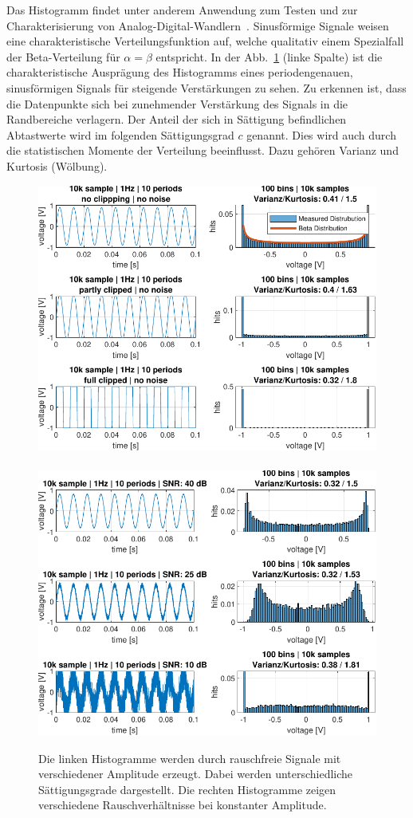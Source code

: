 Das Histogramm findet unter anderem Anwendung zum Testen und zur Charakterisierung von Analog-Digital-Wandlern~\cite{Gamad-2009}. Sinusförmige Sig\-nale weisen eine charakteristische Verteilungsfunktion auf, welche qualitativ einem Spezialfall der Beta-Verteilung für $\alpha = \beta$ entspricht. In der Abb.~\ref{fig:Histogramm-Gain} (linke Spalte) ist die charakteristische Ausprägung des Histogramms eines periodengenauen, sinusförmigen Signals für steigende Verstärkungen zu sehen. Zu erkennen ist, dass die Datenpunkte sich bei zunehmender Verstärkung des Signals in die Randbereiche verlagern. Der Anteil der sich in Sättigung befindlichen Abtastwerte wird im folgenden Sättigungsgrad $c$ genannt. Dies wird auch durch die statistischen Momente der Verteilung beeinflusst. Dazu gehören Varianz und Kurtosis (Wölbung).
\begin{figure}[h!] 
	\hspace*{-2mm}
	\centering 
	\includegraphics[width=1.05\columnwidth]{../img/beta-distribution.pdf}~~~~~
	\includegraphics[width=1.05\columnwidth]{../img/noise-histogramm.pdf}
	\caption{Die linken Histogramme werden durch rauschfreie Signale mit verschiedener Amplitude erzeugt. Dabei werden unterschiedliche Sättigungsgrade dargestellt. Die rechten Histogramme zeigen verschiedene Rauschverhältnisse bei konstanter Amplitude.}
	\label{fig:Histogramm-Gain}
\end{figure} 

